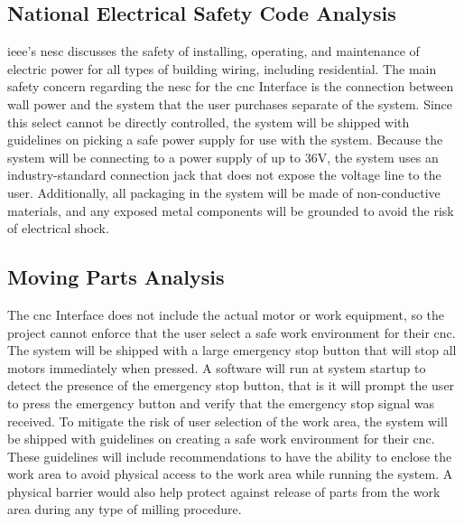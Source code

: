 \subsection{National Electrical Safety Code Analysis}
\gls{ieee}'s \gls{nesc}\cite{ieeenesc} discusses the safety of installing, operating, and maintenance of electric power for all types of building wiring, including residential.
The main safety concern regarding the \gls{nesc} for the \gls{cnc} Interface is the connection between wall power and the system that the user purchases separate of the system.
Since this select cannot be directly controlled, the system will be shipped with guidelines on picking a safe power supply for use with the system.
Because the system will be connecting to a power supply of up to 36V, the system uses an industry-standard connection jack that does not expose the voltage line to the user.
Additionally, all packaging in the system will be made of non-conductive materials, and any exposed metal components will be grounded to avoid the risk of electrical shock\cite{ieeenesc}.

\subsection{Moving Parts Analysis}
The \gls{cnc} Interface does not include the actual motor or work equipment, so the project cannot enforce that the user select a safe work environment for their \gls{cnc}.
The system will be shipped with a large emergency stop button that will stop all motors immediately when pressed.
A software will run at system startup to detect the presence of the emergency stop button, that is it will prompt the user to press the emergency button and verify that the emergency stop signal was received.
To mitigate the risk of user selection of the work area, the system will be shipped with guidelines on creating a safe work environment for their \gls{cnc}.
These guidelines will include recommendations to have the ability to enclose the work area to avoid physical access to the work area while running the system.
A physical barrier would also help protect against release of parts from the work area during any type of milling procedure.


